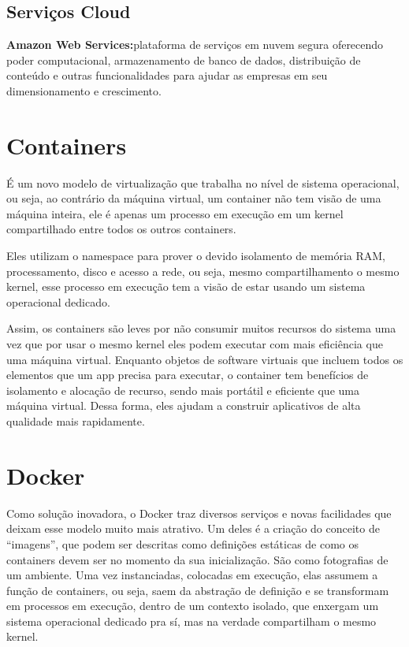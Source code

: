 \subsection{Serviços Cloud}

\textbf{Amazon Web Services:}plataforma de serviços em nuvem segura oferecendo poder computacional, armazenamento de banco de dados, distribuição de conteúdo e outras funcionalidades para ajudar as empresas em seu dimensionamento e crescimento.

\section{Containers}
É um novo modelo de virtualização que trabalha no nível de sistema operacional, ou seja, ao contrário da máquina virtual, um container não tem visão de uma máquina inteira, ele é apenas um processo em execução em um kernel compartilhado entre todos os outros containers.

Eles utilizam o namespace para prover o devido isolamento de memória RAM, processamento, disco e acesso a rede, ou seja, mesmo compartilhamento o mesmo kernel, esse processo em execução tem a visão de estar usando um sistema operacional dedicado.

Assim, os containers são leves por não consumir muitos recursos do sistema uma vez que por usar o mesmo kernel eles podem executar com mais eficiência que uma máquina virtual. Enquanto objetos de software virtuais que incluem todos os elementos que um app precisa para executar, o container tem benefícios de isolamento e alocação de recurso, sendo mais portátil e eficiente que uma máquina virtual. Dessa forma, eles ajudam a construir aplicativos de alta qualidade mais rapidamente.

\section{Docker}
Como solução inovadora, o Docker traz diversos serviços e novas facilidades que deixam esse modelo muito mais atrativo. Um deles é a criação do conceito de “imagens”, que podem ser descritas como definições estáticas de como os containers devem ser no momento da sua inicialização. São como fotografias de um ambiente. Uma vez instanciadas, colocadas em execução, elas assumem a função de containers, ou seja, saem da abstração de definição e se transformam em processos em execução, dentro de um contexto isolado, que enxergam um sistema operacional dedicado pra sí, mas na verdade compartilham o mesmo kernel.

